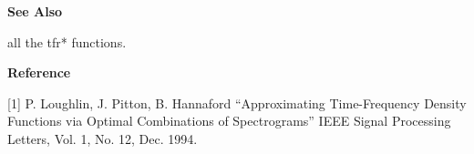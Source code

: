 {\bf \large {}\selectfont See Also}\\
\hspace*{1.5cm}
\begin{minipage}[t]{13.5cm}
all the {\ty tfr*} functions.
\end{minipage}
\vspace*{.2cm}


{\bf \large {}\selectfont Reference}\\
\hspace*{1.5cm}
\begin{minipage}[t]{13.5cm}
[1] P. Loughlin, J. Pitton, B. Hannaford ``Approximating Time-Frequency
Density Functions via Optimal Combinations of Spectrograms'' IEEE Signal
Processing Letters, Vol. 1, No. 12, Dec. 1994. 
\end{minipage}
